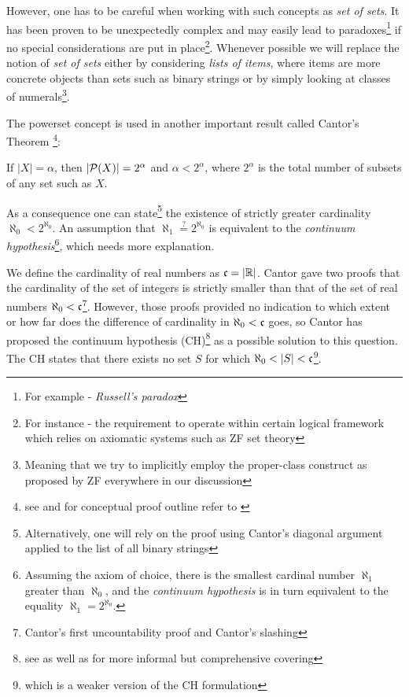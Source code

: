 However, one has to be careful when working with such concepts as \textit{set of sets}. It has been proven to be unexpectedly complex and may easily lead to paradoxes\footnote{For example - \textit{Russell's paradox}} if no special considerations are put in place\footnote{For instance - the requirement to operate within certain logical framework which relies on axiomatic systems such as ZF set theory}. Whenever possible we will replace the notion of \textit{set of sets} either by considering \textit{lists of items}, where items are more concrete objects than sets such as binary strings or by simply looking at classes of numerals\footnote{Meaning that we try to implicitly employ the proper-class construct as proposed by ZF everywhere in our discussion}.

The powerset concept is used in another important result called Cantor's Theorem \footnote{see \cite{jech2003set} and for conceptual proof outline refer to \cite{penrose2007road}}:

\begin{theorem}If $|X| = \alpha$, then $|\mathcal{P}(X)| = 2^\alpha$ and $\alpha < 2^\alpha$, where $2^\alpha$ is the total number of subsets of any set such as $X$.\end{theorem}

As a consequence one can state\footnote{Alternatively, one will rely on the proof using Cantor's diagonal argument\cite{penrose2007road} applied to the list of all binary strings} the existence of strictly greater cardinality $\aleph_{0} < 2^{\aleph_{0}}$. An assumption that $\aleph_{1} \stackrel{?}{=} 2^{\aleph_{0}}$ is equivalent to the \textit{continuum hypothesis}\footnote{Assuming the axiom of choice, there is the smallest cardinal number $\aleph_{1}$ greater than $\aleph_{0}$, and the \textit{continuum hypothesis} is in turn equivalent to the equality $\aleph_{1} = 2^{\aleph_{0}}$\cite{goldrei1996classic}.}, which needs more explanation.

We define the cardinality of real numbers as $\mathfrak{c} = |\mathbb{R}|$. Cantor gave two proofs that the cardinality of the set of integers is strictly smaller than that of the set of real numbers $\aleph_{0} < \mathfrak{c}$\footnote{Cantor's first uncountability proof and Cantor's slashing}. However, those proofs provided no indication to which extent or how far does the difference of cardinality in $\aleph_{0} < \mathfrak{c}$ goes, so Cantor has proposed the continuum hypothesis (CH)\footnote{see \cite{jech2003set, herrlich2006ac} as well as \cite{enwiki:1062726958} for more informal but comprehensive covering} as a possible solution to this question. The CH states that there exists no set $S$ for which $ \aleph_{0} < |S| < \mathfrak{c}$\footnote{which is a weaker version of the CH formulation}.

